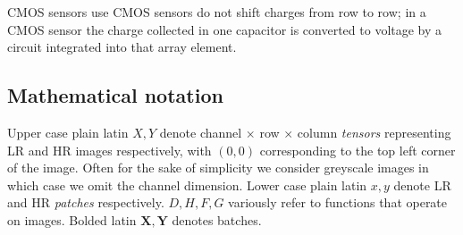 CMOS sensors use
CMOS sensors do not shift charges from row to row; in a CMOS sensor the charge collected in one capacitor is converted to voltage by a circuit integrated into that array element.



%
%


\subsection{Mathematical notation}\label{subsec:notation}
Upper case plain latin $X, Y$ denote channel $\times$ row $\times$ column \textit{tensors} representing LR and HR images respectively, with $(0,0)$ corresponding to the top left corner of the image.
%
Often for the sake of simplicity we consider greyscale images in which case we omit the channel dimension.
%
Lower case plain latin $x, y$ denote LR and HR \textit{patches} respectively.
%
$D, H, F, G$ variously refer to functions that operate on images.
%
Bolded latin $\bm{X}, \bm{Y}$ denotes batches.

